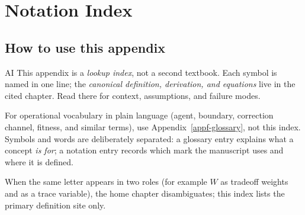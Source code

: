 \chapter{Notation Index}
\label{appa-notation}

\authbarneedspace
\section{How to use this appendix}
\begin{authbar}{AI}
This appendix is a \emph{lookup index}, not a second textbook.
Each symbol is named in one line; the \emph{canonical definition, derivation, and equations} live in the cited chapter.
Read there for context, assumptions, and failure modes.

For operational vocabulary in plain language (agent, boundary, correction channel, fitness, and similar terms), use Appendix~\ref{appf-glossary}, not this index.
Symbols and words are deliberately separated: a glossary entry explains what a concept \emph{is for}; a notation entry records which mark the manuscript uses and where it is defined.

When the same letter appears in two roles (for example $W$ as tradeoff weights and as a trace variable), the home chapter disambiguates; this index lists the primary definition site only.


\end{authbar}
